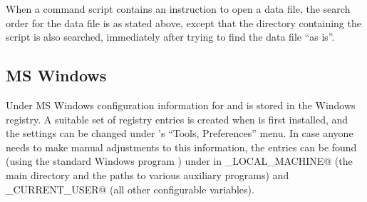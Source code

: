 When a command script contains an instruction to open a data file, the
search order for the data file is as stated above, except that the
directory containing the script is also searched, immediately after
trying to find the data file ``as is''.
      

\subsection{MS Windows}
\label{MS-behave}

Under MS Windows configuration information for  and
 is stored in the Windows registry. A suitable set of
registry entries is created when  is first installed, and
the settings can be changed under 's ``Tools, Preferences''
menu. In case anyone needs to make manual adjustments to this
information, the entries can be found (using the standard Windows
program ) under \verb@Software\gretl@ in
\verb@HKEY_LOCAL_MACHINE@ (the main  directory and the
paths to various auxiliary programs) and \verb@HKEY_CURRENT_USER@ (all
other configurable variables).

